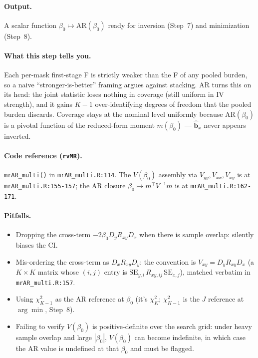 \documentclass[11pt]{article}
\begin{document}
\paragraph{Output.} A scalar function $\beta_0\mapsto\mathrm{AR}(\beta_0)$ ready for inversion (Step~7) and minimization (Step~8).

\paragraph{What this step tells you.} Each per-mask first-stage F is strictly weaker than the F of any pooled burden, so a naive ``stronger-is-better'' framing argues against stacking. AR turns this on its head: the joint statistic loses nothing in coverage (still uniform in IV strength), and it gains $K-1$ over-identifying degrees of freedom that the pooled burden discards. Coverage stays at the nominal level uniformly because $\mathrm{AR}(\beta_0)$ is a pivotal function of the reduced-form moment $m(\beta_0)$ --- $\hat{\boldsymbol b}_x$ never appears inverted.

\paragraph{Code reference (\texttt{rvMR}).} \verb|mrAR_multi()| in \verb|mrAR_multi.R:114|. The $V(\beta_0)$ assembly via $V_{yy}, V_{xx}, V_{xy}$ is at \verb|mrAR_multi.R:155-157|; the AR closure $\beta_0\mapsto m^\top V^{-1} m$ is at \verb|mrAR_multi.R:162-171|.

\paragraph{Pitfalls.}
\begin{itemize}
\item Dropping the cross-term $-2\beta_0 D_y R_{xy} D_x$ when there is sample overlap: silently biases the CI.
\item Mis-ordering the cross-term as $D_x R_{xy} D_y$: the convention is $V_{xy} = D_y R_{xy} D_x$ (a $K\times K$ matrix whose $(i,j)$ entry is $\mathrm{SE}_{y,i}\,R_{xy,ij}\,\mathrm{SE}_{x,j}$), matched verbatim in \verb|mrAR_multi.R:157|.
\item Using $\chi^2_{K-1}$ as the AR reference at $\beta_0$ (it's $\chi^2_K$; $\chi^2_{K-1}$ is the $J$ reference at $\arg\min$, Step~8).
\item Failing to verify $V(\beta_0)$ is positive-definite over the search grid: under heavy sample overlap and large $|\beta_0|$, $V(\beta_0)$ can become indefinite, in which case the AR value is undefined at that $\beta_0$ and must be flagged.
\end{itemize}
\end{document}
